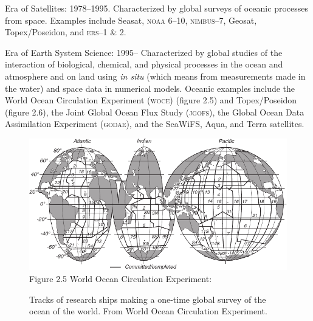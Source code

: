 \begin{enumerate}
\vitem Era of Satellites: 1978--1995. Characterized by global surveys
of oceanic processes from space. Examples include Seasat,
\textsc{noaa} 6--10, \textsc{nimbus}--7, Geosat,
Topex/\-Poseidon, and \textsc{ers}--1 \&
2.

\vitem Era of Earth System Science: 1995-- Characterized by global
studies of the interaction of biological, chemical, and physical
processes in the ocean and atmosphere and on land using \textit{in
  situ}  (which means from measurements made in
the water) and space data in numerical models. Oceanic examples
include the World Ocean Circulation Experiment
(\textsc{woce}) (figure 2.5)
and Topex/Poseidon (figure 2.6), the Joint Global Ocean Flux Study
 (\textsc{jgofs}), the
Global Ocean Data Assimilation Experiment (\textsc {godae}), and the
SeaWiFS, Aqua, and Terra satellites.
\end{enumerate}

\begin{figure}[t!]
\includegraphics{pics/wocesurvey}
\centering
\footnotesize
Figure 2.5 World Ocean
Circulation Experiment:\rule{0pt}{4ex} Tracks of research ships making
a one-time global survey of the ocean of the world. From World Ocean
Circulation Experiment.

\label{fig:wocesurvey}
\vspace{-3ex}
\end{figure}

